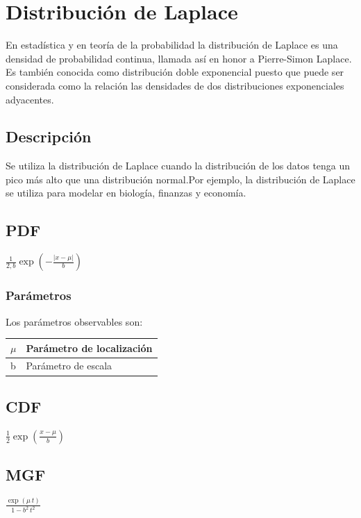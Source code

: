 \chapter{Distribución de Laplace}

En estadística y en teoría de la probabilidad la distribución de Laplace es una densidad de probabilidad continua, llamada así en honor a Pierre-Simon Laplace. Es también conocida como distribución doble exponencial puesto que puede ser considerada como la relación las densidades de dos distribuciones exponenciales adyacentes. \cite{wiki:5}

\section{Descripción}

Se utiliza la distribución de Laplace cuando la distribución de los datos tenga un pico más alto que una distribución normal.Por ejemplo, la distribución de Laplace se utiliza para modelar en biología, finanzas y economía.

\section{PDF}
\begin{center}
	$\frac {1}{2,b} \exp(-\frac {|x-\mu|}{b})$
\end{center}
\subsection{Parámetros}
Los parámetros observables son:

\begin{center}
	\begin{tabular} {| l | l |}
		\hline
		$\mu$ & Parámetro de localización \\ \hline
		b & Parámetro de escala\\ \hline
	\end{tabular}
\end{center}

\section{CDF}
\begin{center}
	$\frac {1}{2} \exp(\frac {x-\mu}{b})$
\end{center}

\section{MGF}
\begin{center}
	$\frac{\exp(\mu \,t)}{1-b^{2}\,t^{2}}$
\end{center}

